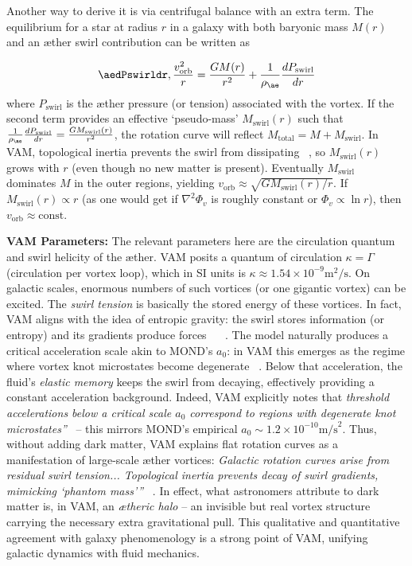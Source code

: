 \documentclass[a4paper, aps,preprint,superscriptaddress, 12pt]{revtex4}
\begin{document}
Another way to derive it is via centrifugal balance with an extra term. The equilibrium for a star at radius $r$ in a galaxy with both baryonic mass $M(r)$ and an æther swirl contribution can be written as

\begin{equation}\aedPswirldr,\frac{v_{\text{orb}}^2}{r} = \frac{GM(r)}{r^2} + \frac{1}{\rho_{\ae}}\frac{dP_{\text{swirl}}}{dr}
\end{equation}
where $P_{\text{swirl}}$ is the æther pressure (or tension) associated with the vortex. If the second term provides an effective `pseudo-mass' $M_{\text{swirl}}(r)$ such that $\frac{1}{\rho_{\ae}}\frac{dP_{\text{swirl}}}{dr} = \frac{G M_{\text{swirl}}(r)}{r^2}$, the rotation curve will reflect $M_{\text{total}} = M + M_{\text{swirl}}$. In VAM, topological inertia prevents the swirl from dissipating~\cite{Iskandarani2025c} , so $M_{\text{swirl}}(r)$ grows with $r$ (even though no new matter is present). Eventually $M_{\text{swirl}}$ dominates $M$ in the outer regions, yielding $v_{\text{orb}} \approx \sqrt{G M_{\text{swirl}}(r)/r}$. If $M_{\text{swirl}}(r)\propto r$ (as one would get if $\nabla^2\Phi_v$ is roughly constant or $\Phi_v \propto \ln r$), then $v_{\text{orb}}\approx \text{const}$.


\textbf{VAM Parameters:} The relevant parameters here are the circulation quantum and swirl helicity of the æther. VAM posits a quantum of circulation $\kappa = \Gamma$ (circulation per vortex loop), which in SI units is $\kappa \approx 1.54\times10^{-9}\text{m}^2/\text{s}$. On galactic scales, enormous numbers of such vortices (or one gigantic vortex) can be excited. The \textit{swirl tension} is basically the stored energy of these vortices. In fact, VAM aligns with the idea of entropic gravity: the swirl stores information (or entropy) and its gradients produce forces~\cite{Iskandarani2025c} ~\cite{Iskandarani2025c} . The model naturally produces a critical acceleration scale akin to MOND's $a_0$: in VAM this emerges as the regime where vortex knot microstates become degenerate~\cite{Iskandarani2025c} . Below that acceleration, the fluid's \textit{elastic memory} keeps the swirl from decaying, effectively providing a constant acceleration background. Indeed, VAM explicitly notes that \textit{\grqq threshold accelerations below a critical scale $a_0$ correspond to regions with degenerate knot microstates\textquotedblright}~\cite{Iskandarani2025c}  – this mirrors MOND's empirical $a_0 \sim 1.2\times10^{-10}\text{m/s}^2$. Thus, without adding dark matter, VAM explains flat rotation curves as a manifestation of large-scale æther vortices: \textit{\grqq Galactic rotation curves arise from residual swirl tension... Topological inertia prevents decay of swirl gradients, mimicking ‘phantom mass'\textquotedblright}~\cite{Iskandarani2025c} . In effect, what astronomers attribute to dark matter is, in VAM, an \textit{ætheric halo} – an invisible but real vortex structure carrying the necessary extra gravitational pull. This qualitative and quantitative agreement with galaxy phenomenology is a strong point of VAM, unifying galactic dynamics with fluid mechanics.
\end{document}
